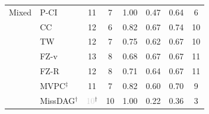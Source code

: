 \begin{tabular}{llcccccc}
    \midrule
    Mixed     & P-CI               & 11 & 7 & 1.00 & 0.47 & 0.64 & 6 \\
              & CC                 & 12 & 6 & 0.82 & 0.67 & 0.74 & 10 \\
              & TW                 & 12 & 7 & 0.75 & 0.62 & 0.67 & 10 \\
              & FZ-v               & 13 & 8 & 0.68 & 0.67 & 0.67 & 11 \\
              & FZ-R               & 12 & 8 & 0.71 & 0.64 & 0.67 & 11 \\
              & MVPC$^\ddagger$    & 11 & 7 & 0.82 & 0.60 & 0.70 & 9 \\
              & MissDAG$^\dagger$  & \textcolor{lightgray}{10}$^\dagger$ & 10 & 1.00 & 0.22 & 0.36 & 3 \\
    \bottomrule
\end{tabular}
